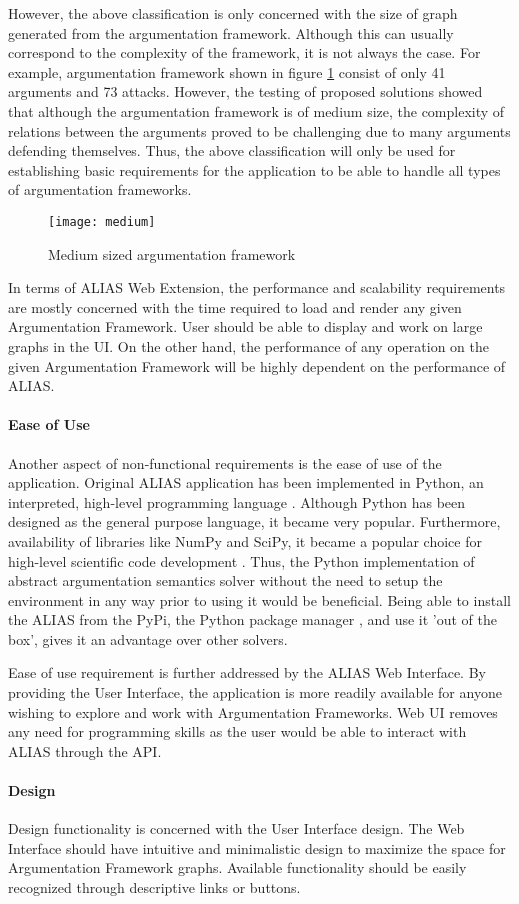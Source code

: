 However, the above classification is only concerned with the size of graph generated from the argumentation framework. Although this can usually correspond to the complexity of the framework, it is not always the case. For example, argumentation framework shown in figure \ref{fig:mediumAF} consist of only 41 arguments and 73 attacks. However, the testing of proposed solutions showed that although the argumentation framework is of medium size, the complexity of relations between the arguments proved to be challenging due to many arguments defending themselves. Thus, the above classification will only be used for establishing basic requirements for the application to be able to handle all types of argumentation frameworks. 

\begin{figure}[h]
	\texttt{[image: medium]}
	\caption{Medium sized argumentation framework}
	\label{fig:mediumAF}
\end{figure}

In terms of ALIAS Web Extension, the performance and scalability requirements are mostly concerned with the time required to load and render any given Argumentation Framework. User should be able to display and work on large graphs in the UI. On the other hand, the performance of any operation on the given Argumentation Framework will be highly dependent on the performance of ALIAS.

\paragraph{Ease of Use}

Another aspect of non-functional requirements is the ease of use of the application. Original ALIAS application has been implemented in Python, an interpreted, high-level programming language \citep{millman2011python}. Although Python has been designed as the general purpose language, it became very popular. Furthermore, availability of libraries like NumPy and SciPy, it became a popular choice for high-level scientific code development \citep{perez2011python}. Thus, the Python implementation of abstract argumentation semantics solver without the need to setup the environment in any way prior to using it would be beneficial. Being able to install the ALIAS from the PyPi, the Python package manager \citep{pypi}, and use it 'out of the box', gives it an advantage over other solvers.

Ease of use requirement is further addressed by the ALIAS Web Interface. By providing the User Interface, the application is more readily available for anyone wishing to explore and work with Argumentation Frameworks. Web UI removes any need for programming skills as the user would be able to interact with ALIAS through the API.

\paragraph{Design} 
Design functionality is concerned with the User Interface design. The Web Interface should have intuitive and minimalistic design to maximize the space for Argumentation Framework graphs. Available functionality should be easily recognized through descriptive links or buttons.